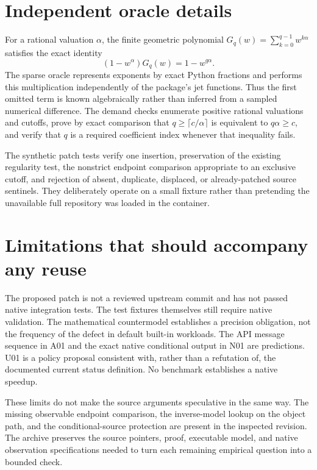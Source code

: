 \documentclass[11pt,letterpaper]{article}
\theoremstyle{definition}\newtheorem{definition}[proposition]{Definition}
\begin{document}
\section{Independent oracle details}
For a rational valuation $\alpha$, the finite geometric polynomial
$G_q(w)=\sum_{k=0}^{q-1}w^{k\alpha}$ satisfies the exact identity
\begin{equation}
 (1-w^\alpha)G_q(w)=1-w^{q\alpha}.
\end{equation}
The sparse oracle represents exponents by exact Python fractions and performs
this multiplication independently of the package's jet functions. Thus the
first omitted term is known algebraically rather than inferred from a sampled
numerical difference. The demand checks enumerate positive rational valuations
and cutoffs, prove by exact comparison that
$q\ge\lceil c/\alpha\rceil$ is equivalent to $q\alpha\ge c$, and verify that
$q$ is a required coefficient index whenever that inequality fails.

The synthetic patch tests verify one insertion, preservation of the existing
regularity test, the nonstrict endpoint comparison appropriate to an exclusive
cutoff, and rejection of absent, duplicate, displaced, or already-patched source
sentinels. They deliberately operate on a small fixture rather than pretending
the unavailable full repository was loaded in the container.

\section{Limitations that should accompany any reuse}
The proposed patch is not a reviewed upstream commit and has not passed native
integration tests. The test fixtures themselves still require native validation.
The mathematical countermodel establishes a precision obligation, not the
frequency of the defect in default built-in workloads. The API message sequence
in A01 and the exact native conditional output in N01 are predictions. U01 is a
policy proposal consistent with, rather than a refutation of, the documented
current status definition. No benchmark establishes a native speedup.

These limits do not make the source arguments speculative in the same way.
The missing observable endpoint comparison, the inverse-model lookup on the
object path, and the conditional-source protection are present in the inspected
revision. The archive preserves the source pointers, proof, executable model,
and native observation specifications needed to turn each remaining empirical
question into a bounded check.
\end{document}
